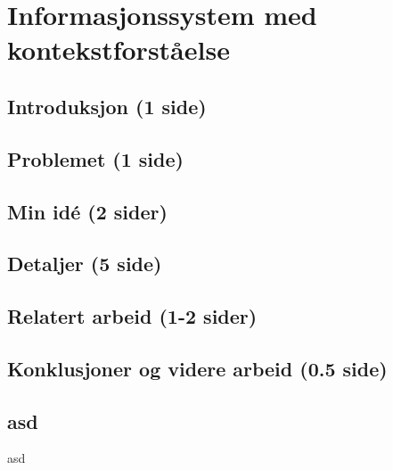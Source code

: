 \section{Informasjonssystem med kontekstforståelse}
\subsection{Introduksjon (1 side)}

\subsection{Problemet (1 side)}

\subsection{Min idé (2 sider)}

\subsection{Detaljer (5 side)}

\subsection{Relatert arbeid (1-2 sider)}

\subsection{Konklusjoner og videre arbeid (0.5 side)}

\subsection*{asd}
asd